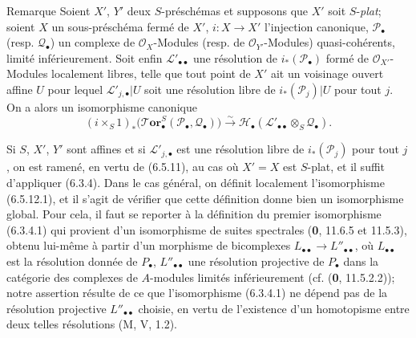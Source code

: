 \begin{namedtheorem}[6.5.12]{Remarque}
Soient $X'$, $Y'$ deux $S$-préschémas et supposons que $X'$ soit $S$-\emph{plat};
soient $X$ un sous-préschéma fermé de $X'$, $i:X\to X'$ l'injection canonique,
$\mathscr P_\bullet$ (resp. $\mathscr Q_\bullet$) un complexe de
$\mathscr O_X$-Modules (resp. de $\mathscr O_{Y'}$-Modules) quasi-cohérents,
limité inférieurement. Soit enfin $\mathscr L'_{\bullet\bullet}$ une résolution
de $i_*(\mathscr P_\bullet)$ formé de $\mathscr O_{X'}$-Modules localement
libres, telle que tout point de $X'$ ait un voisinage ouvert affine $U$ pour
lequel $\mathscr L'_{j,\bullet}|U$ soit une résolution libre de
$i_*(\mathscr P_j)|U$ pour tout $j$. On a alors un isomorphisme canonique
\[
  (i\times_S 1)_*
  \bigl(\boldsymbol{\mathscr{T}\!or}_\bullet^S
    (\mathscr P_\bullet,\mathscr Q_\bullet)\bigr)
  \xrightarrow{\sim}
  \mathscr H_\bullet
  (\mathscr L'_{\bullet\bullet}\otimes_S\mathscr Q_\bullet).
  \tag{6.5.12.1}\label{III.6.5.12.1.fr}
\]

Si $S$, $X'$, $Y'$ sont affines et si $\mathscr L'_{j,\bullet}$ est une
résolution libre de $i_*(\mathscr P_j)$ pour tout $j$, on est ramené, en vertu
de (6.5.11), au cas où $X'=X$ est $S$-plat, et il suffit d'appliquer (6.3.4).
Dans le cas général, on définit localement l'isomorphisme (6.5.12.1), et il
s'agit de vérifier que cette définition donne bien un isomorphisme global.
Pour cela, il faut se reporter à la définition du premier isomorphisme
(6.3.4.1) qui provient d'un isomorphisme de suites spectrales (\textbf{0}, 11.6.5 et
11.5.3), obtenu lui-même à partir d'un morphisme de bicomplexes
$L_{\bullet\bullet}\to L''_{\bullet\bullet}$, où $L_{\bullet\bullet}$ est la
résolution donnée de $P_\bullet$, $L''_{\bullet\bullet}$ une résolution
projective de $P_\bullet$ dans la catégorie des complexes de $A$-modules
limités
inférieurement (cf. (\textbf{0}, 11.5.2.2)); notre assertion résulte de ce que
l'isomorphisme (6.3.4.1) ne dépend pas de la résolution projective
$L''_{\bullet\bullet}$ choisie, en vertu de l'existence d'un homotopisme entre
deux telles résolutions (M, V, 1.2).
\end{namedtheorem}

